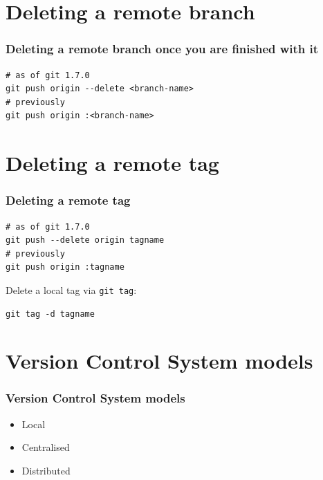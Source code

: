 \documentclass{git_course}
\begin{document}
\section{Deleting a remote branch}

\begin{frame}[fragile]
    \frametitle{Deleting a remote branch once you are finished with it}

\begin{lstlisting}
# as of git 1.7.0
git push origin --delete <branch-name>
# previously
git push origin :<branch-name>
\end{lstlisting}
\end{frame}

\section{Deleting a remote tag}

\begin{frame}[fragile]
\frametitle{Deleting a remote tag}

\begin{lstlisting}
# as of git 1.7.0
git push --delete origin tagname
# previously
git push origin :tagname
\end{lstlisting}

Delete a local tag via \texttt{git tag}:
\begin{lstlisting}
git tag -d tagname
\end{lstlisting}
\end{frame}

\appendix

\section{Version Control System models}

\begin{frame}
    \frametitle{Version Control System models}
    \begin{itemize}
        \item Local
        \item Centralised
        \item Distributed
    \end{itemize}
\end{frame}
\end{document}

